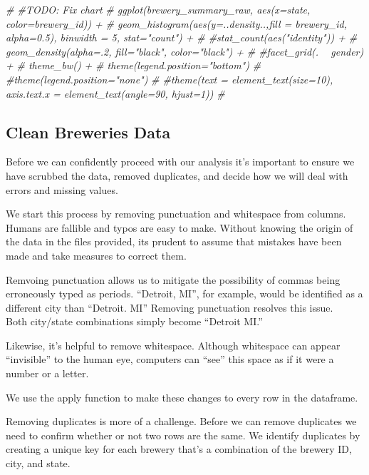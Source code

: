 \documentclass[]{article}
\newenvironment{Shaded}{\begin{snugshade}}{\end{snugshade}}
\newcommand{\CommentTok}[1]{\textcolor[rgb]{0.56,0.35,0.01}{\textit{#1}}}
\begin{document}
\begin{Shaded}
\begin{Highlighting}[]
\CommentTok{# #TODO: Fix chart}
\CommentTok{# ggplot(brewery_summary_raw, aes(x=state, color=brewery_id)) +}
\CommentTok{#     geom_histogram(aes(y=..density..,fill = brewery_id, alpha=0.5), binwidth = 5, stat="count") +}
\CommentTok{#     #stat_count(aes("identity")) +}
\CommentTok{#     geom_density(alpha=.2, fill="black", color="black") +}
\CommentTok{#     #facet_grid(. ~ gender) +}
\CommentTok{#     theme_bw() +}
\CommentTok{#     theme(legend.position="bottom")}
\CommentTok{#     #theme(legend.position="none")}
\CommentTok{#     #theme(text = element_text(size=10), axis.text.x = element_text(angle=90, hjust=1)) }
\CommentTok{# }
\end{Highlighting}
\end{Shaded}

\subsection{Clean Breweries Data}\label{clean-breweries-data}

Before we can confidently proceed with our analysis it's important to
ensure we have scrubbed the data, removed duplicates, and decide how we
will deal with errors and missing values.

We start this process by removing punctuation and whitespace from
columns. Humans are fallible and typos are easy to make. Without knowing
the origin of the data in the files provided, its prudent to assume that
mistakes have been made and take measures to correct them.

Remvoing punctuation allows us to mitigate the possibility of commas
being erroneously typed as periods. ``Detroit, MI'', for example, would
be identified as a different city than ``Detroit. MI'' Removing
punctuation resolves this issue.\\
Both city/state combinations simply become ``Detroit MI.''

Likewise, it's helpful to remove whitespace. Although whitespace can
appear ``invisible'' to the human eye, computers can ``see'' this space
as if it were a number or a letter.

We use the apply function to make these changes to every row in the
dataframe.

Removing duplicates is more of a challenge. Before we can remove
duplicates we need to confirm whether or not two rows are the same. We
identify duplicates by creating a unique key for each brewery that's a
combination of the brewery ID, city, and state.
\end{document}
